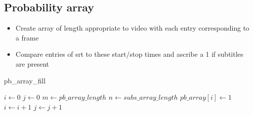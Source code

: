 \documentclass[notes]{beamer}
\begin{document}
\subsection{Probability array}
\begin{itemize}
	\item Create array of length appropriate to video with each entry corresponding to a frame
	\item Compare entries of srt to these start/stop times and ascribe a 1 if subtitles are present
\end{itemize}

\begin{algorithm}
	\caption{pb\_array\_fill}\label{euclid}
	\begin{algorithmic}[1]
		\Procedure{}{}
		\State $i \gets 0$
		\State $j \gets 0$
		\State $m \gets pb\_array\_length$
		\State $n \gets subs\_array\_length$
			\BREAK
			\EndIf
			\BREAK
			\EndIf
				\State $pb\_array[i] \gets 1$
				\State $i \gets i+1$
				\EndIf
		\Else
			\State $j \gets j+1$
		\EndIf
		\EndIf
		\EndProcedure
	\end{algorithmic}
\end{algorithm}
\end{document}
